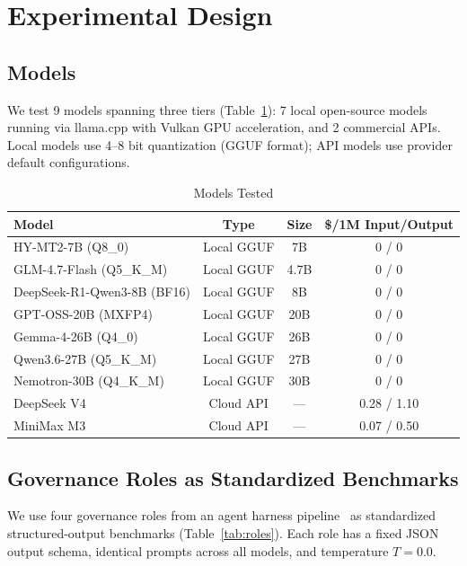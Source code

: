 \documentclass[11pt,a4paper]{article}
\begin{document}
\section{Experimental Design}

\subsection{Models}

We test 9 models spanning three tiers (Table~\ref{tab:models}): 7 local open-source models running via llama.cpp with Vulkan GPU acceleration, and 2 commercial APIs. Local models use 4--8 bit quantization (GGUF format); API models use provider default configurations.

\begin{table}[htbp]\centering\caption{Models Tested}\label{tab:models}\small
\begin{tabular}{lccc}\toprule\textbf{Model} & \textbf{Type} & \textbf{Size} & \textbf{\$/1M Input/Output}\\\midrule
HY-MT2-7B (Q8\_0) & Local GGUF & 7B & 0 / 0\\
GLM-4.7-Flash (Q5\_K\_M) & Local GGUF & 4.7B & 0 / 0\\
DeepSeek-R1-Qwen3-8B (BF16) & Local GGUF & 8B & 0 / 0\\
GPT-OSS-20B (MXFP4) & Local GGUF & 20B & 0 / 0\\
Gemma-4-26B (Q4\_0) & Local GGUF & 26B & 0 / 0\\
Qwen3.6-27B (Q5\_K\_M) & Local GGUF & 27B & 0 / 0\\
Nemotron-30B (Q4\_K\_M) & Local GGUF & 30B & 0 / 0\\\midrule
DeepSeek V4 & Cloud API & --- & 0.28 / 1.10\\
MiniMax M3 & Cloud API & --- & 0.07 / 0.50\\\bottomrule
\end{tabular}
\end{table}

\subsection{Governance Roles as Standardized Benchmarks}

We use four governance roles from an agent harness pipeline~\cite{chen2026empirical} as standardized structured-output benchmarks (Table~\ref{tab:roles}). Each role has a fixed JSON output schema, identical prompts across all models, and temperature $T=0.0$.
\end{document}

